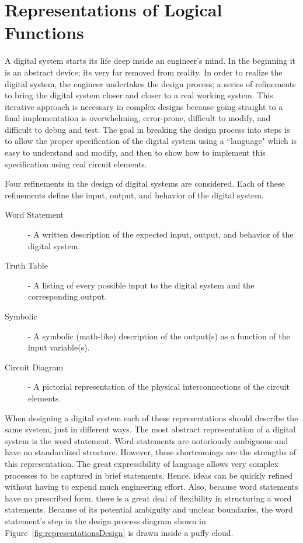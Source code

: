 \chapter{Representations of Logical Functions}
\label{chapter:Representations of Logical Functions}
\graphicspath{ {./chapter02/Fig} }

A digital system starts its life deep inside an engineer's mind.  
In the beginning it is an abstract device; its very far removed 
from reality.  In order to realize the digital system, the engineer
undertakes the design process; a series of refinements to bring
the digital system closer and closer to a real working system.  This 
iterative approach is necessary in complex designs because going straight
to a final implementation is overwhelming, error-prone, difficult
to modify, and difficult to debug and test.  The goal in breaking the 
design process into steps is to allow the proper specification of the
digital system using a ``language" which is easy to understand and modify,
and then to show how to implement this specification using real circuit 
elements. 

Four refinements in the design of digital systems are 
considered.  Each of these refinements define the input, output, and 
behavior of the digital system.  

\begin{description}
\item [Word Statement] - A written description of the expected 
	input, output, and behavior of the digital system.
\item [Truth Table] -  A listing of every possible input to the
	digital system and the corresponding output.  
\item [Symbolic] - A symbolic (math-like) description of the 
	output(s) as a function of the input variable(s).
\item [Circuit Diagram] - A pictorial representation of the 
	physical interconnections of the circuit elements.
\end{description}

When designing a digital system each of these representations should
describe the same system, just in different ways.  The most abstract 
representation of a digital system is the word statement.  Word 
statements are notoriously ambiguous and have no standardized structure.  
However, these shortcomings are the strengths of this representation. The great
expressibility of language allows very complex processes to be captured 
in brief statements.  Hence, ideas can be quickly refined 
without having to expend much engineering effort.  Also, because 
word statements have no prescribed form, there is a great deal 
of flexibility in structuring a word statements.  Because of its
potential ambiguity and unclear boundaries, the word statement's step 
in the design process diagram shown in Figure~\ref{fig:representationsDesign} is 
drawn inside a puffy cloud.

